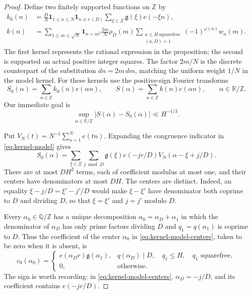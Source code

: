 \begin{proof}
Define two finitely supported functions on $\mathbb Z$ by
\begin{align}
 k_0(n)
 &=\frac DN\mathbf1_{1\le n\le N}\mathbf1_{n\equiv r\ (D)}
       \sum_{\xi\in\Xi}\mathfrak g(\xi)e(-\xi n),
       \label{eq:kernel-model}\\
 k(n)
 &=\sum_{1\le m\le\sqrt N}\mathbf1_{n=m^2}\frac{2m}{N}\rho_D(m)
       \sum_{\substack{u\le H\ \mathrm{squarefree}\\(u,D)=1}}
                   (-1)^{\omega(u)}w_u(m).
       \label{eq:kernel-actual}
\end{align}
The first kernel represents the rational expression in the proposition;
the second is supported on actual positive integer squares. The factor
$2m/N$ is the discrete counterpart of the substitution
$dn=2m\,dm$, matching the uniform weight $1/N$ in the model kernel.
For these kernels use the positive-sign Fourier transforms
\[
 S_0(\alpha)=\sum_{n\in\mathbb Z}k_0(n)e(\alpha n),
 \qquad
 S(\alpha)=\sum_{n\in\mathbb Z}k(n)e(\alpha n),
 \qquad \alpha\in\mathbb R/\mathbb Z.
\]
Our immediate goal is
\begin{equation}
 \sup_{\alpha\in\mathbb R/\mathbb Z}|S(\alpha)-S_0(\alpha)|
 \ll H^{-1/3}.
 \label{eq:kernel-uniform-approximation}
\end{equation}

Put $V_N(t)=N^{-1}\sum_{n=1}^N e(tn)$.
Expanding the congruence indicator in \eqref{eq:kernel-model} gives
\begin{equation}
 S_0(\alpha)=\sum_{\xi\in\Xi}\sum_{j\bmod D}
    \mathfrak g(\xi)e(-jr/D)V_N(\alpha-\xi+j/D).
 \label{eq:kernel-model-centers}
\end{equation}
There are at most $DH^2$ terms, each of coefficient modulus at most
one, and their centers have denominators at most $DH$.
The centers are distinct. Indeed, an equality
$\xi-j/D=\xi'-j'/D$ would make $\xi-\xi'$ have denominator both
coprime to $D$ and dividing $D$, so that $\xi=\xi'$ and $j=j'$ modulo $D$.

Every $\alpha_0\in\mathbb Q/\mathbb Z$ has a unique decomposition
$\alpha_0=\alpha_D+\alpha_1$ in which the denominator of $\alpha_D$
has only prime factors dividing $D$ and $q_1=q(\alpha_1)$ is coprime
to $D$. Thus the coefficient of the center $\alpha_0$ in
\eqref{eq:kernel-model-centers}, taken to be zero when it is absent, is
\begin{equation}
 c_0(\alpha_0)=
 \begin{cases}
 e(\alpha_Dr)\mathfrak g(\alpha_1),&
 q(\alpha_D)\mid D,\quad q_1\le H,\quad q_1\text{ squarefree},\\
 0,&\text{otherwise}.
 \end{cases}
 \label{eq:kernel-model-coefficient}
\end{equation}
The sign is worth recording: in \eqref{eq:kernel-model-centers},
$\alpha_D=-j/D$, and its coefficient contains $e(-jr/D)$.


\end{proof}
